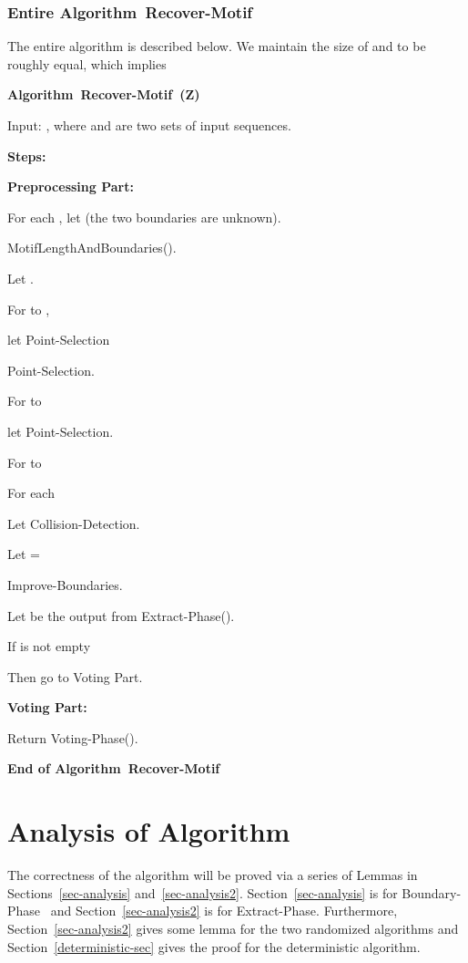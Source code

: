 \documentclass[11pt]{article}
\newcommand{\algmnam}{Recover-Motif}
\newcommand{\algmname}{Algorithm~\algmnam}
\newcommand{\algma}{\algmname~}
\newcommand{\phaseone}{Boundary-Phase}
\newcommand{\phasetwo}{Extract-Phase}
\newcommand{\phasethree}{Voting-Phase}
\begin{document}
\subsubsection{Entire \algma}

 The entire algorithm is described below. We maintain the size of  and  to be
roughly equal, which implies


{\bf \algma(Z)}


Input: , where  and
 are two sets of input sequences.

{\bf Steps:}


{\bf Preprocessing Part:}

For each , let  (the
two boundaries are unknown).

MotifLengthAndBoundaries().


Let .

For  to ,

\qquad let Point-Selection

\qquad \qquad \qquad\hskip 13pt Point-Selection.


For  to 

\qquad let Point-Selection.


For  to 



\qquad For each 

\qquad\qquad Let Collision-Detection.

\qquad\qquad Let =

\qquad\qquad\qquad Improve-Boundaries.



\qquad Let  be the output from
\phasetwo().



\qquad If  is not empty

\qquad Then go to Voting Part.



{\bf Voting Part:}

\qquad Return \phasethree().

{\bf End of \algma}










\section{Analysis of Algorithm}\label{analysis-sec}
 The correctness
of the algorithm will be proved via a series of Lemmas in
Sections~\ref{sec-analysis} and~\ref{sec-analysis2}.
Section~\ref{sec-analysis} is for \phaseone~ and
Section~\ref{sec-analysis2} is for \phasetwo. Furthermore,
Section~\ref{sec-analysis2} gives some lemma for the two randomized
algorithms and Section~\ref{deterministic-sec} gives the proof for
the deterministic algorithm.
\end{document}
